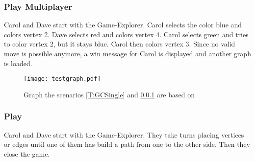 \subsubsection{Play {\graphcoloring} Multiplayer} \label{T:GCMulti}

Carol and Dave start {\graphcoloring} with the Game-Explorer. Carol selects the color blue and colors vertex 2. Dave selects red and colors vertex 4. Carol selects green and tries to color vertex 2, but it stays blue. Carol then colors vertex 3. Since no valid move is possible anymore, a win message for Carol is displayed and another graph is loaded.

\begin{figure}[h!]
	\centering
	\texttt{[image: testgraph.pdf]}
	\caption{Graph the scenarios \ref{T:GCSingle} and \ref{T:GCMulti} are based on}
	\label{img:ACTDEV}
\end{figure}

\subsubsection{Play \twixt}

Carol and Dave start {\twixt} with the Game-Explorer. They take turns placing vertices or edges until one of them has build a path from one to the other side. Then they close the game.
